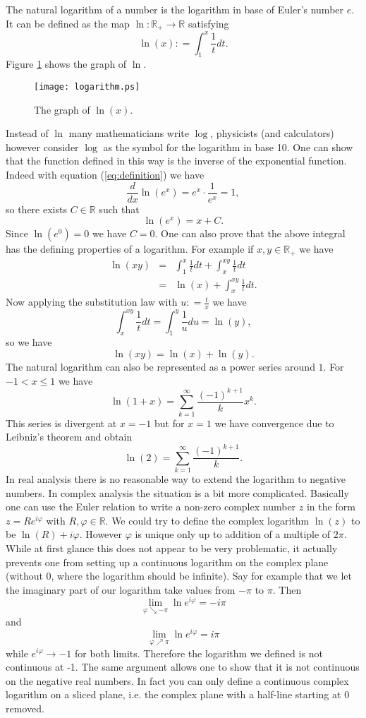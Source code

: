 \documentclass[12pt]{article}
\begin{document}
The natural logarithm of a number is the logarithm in base of Euler's number $e$. It can be defined as the map $\ln\colon\mathbb{R}_+\to\mathbb{R}$ satisfying
\begin{equation}\label{eq:definition}
\ln(x)\colon =\int_1^x\frac{1}{t}dt.
\end{equation}
Figure \ref{fig:graph} shows the graph of $\ln$.
\begin{figure}[htbp]
\begin{centering}
\texttt{[image: logarithm.ps]}
\caption{The graph of $\ln(x)$.}\label{fig:graph}
\end{centering}
\end{figure}
Instead of $\ln$ many mathematicians write $\log$, physicists (and calculators) however consider $\log$ as the symbol for the logarithm in base 10.
One can show that the function defined in this way is the inverse of the exponential function. Indeed with equation (\ref{eq:definition}) we have
$$\frac{d}{dx}\ln(e^x)=e^x\cdot\frac{1}{e^x}=1,$$
so there exists $C\in\mathbb{R}$ such that
$$\ln(e^x)=x+C.$$
Since $\ln(e^0)=0$ we have $C=0$.
One can also prove that the above integral has the defining properties of a logarithm. For example if $x,y\in\mathbb{R}_+$ we have
\begin{eqnarray*}
\ln(xy)&=&\int_1^x\frac{1}{t}\mathit{dt}+\int_x^{xy}\frac{1}{t}\mathit{dt}\\
&=&\ln(x)+\int_x^{xy}\frac{1}{t}dt.
\end{eqnarray*}
Now applying the substitution law with $u\colon =\frac{t}{x}$ we have
$$\int_x^{xy}\frac{1}{t}\mathit{dt}=\int_1^y\frac{1}{u}\mathit{du}=\ln(y),$$
so we have
$$\ln(xy)=\ln(x)+\ln(y).$$
The natural logarithm can also be represented as a power series around $1$. For $-1<x\le 1$ we have
\begin{equation}\label{eq:power}
\ln(1+x)=\sum_{k=1}^\infty \frac{(-1)^{k+1}}{k}x^k.
\end{equation}
This series is divergent at $x=-1$ but for $x=1$ we have convergence due to Leibniz's theorem and obtain
$$\ln(2)=\sum_{k=1}^\infty \frac{(-1)^{k+1}}{k}.$$
In real analysis there is no reasonable way to extend the logarithm to negative numbers. In complex analysis the situation is a bit more complicated. Basically one can use the Euler relation to write a non-zero complex number $z$ in the form $z=Re^{i\varphi}$ with $R,\varphi\in\mathbb{R}$. 
We could try to define the complex logarithm $\ln(z)$ to be $\ln(R)+i\varphi$. However $\varphi$ is unique only up to addition of a multiple of $2\pi$.
While at first glance this does not appear to be very problematic, it actually prevents one from setting up a continuous logarithm on the complex plane (without 0, where the logarithm should be infinite). Say for example that we let the imaginary part of our logarithm take values from $-\pi$ to $\pi$. Then
$$\lim_{\varphi\searrow-\pi}\ln e^{i\varphi}=-i\pi$$
and
$$\lim_{\varphi\nearrow\pi}\ln e^{i\varphi}=i\pi$$
while $e^{i\varphi}\to-1$ for both limits. Therefore the logarithm we defined is not continuous at -1. The same argument allows one to show that it is not continuous on the negative real numbers. In fact you can only define a continuous complex logarithm on a sliced plane, i.e. the complex plane with a half-line starting at 0 removed. 
\end{document}
